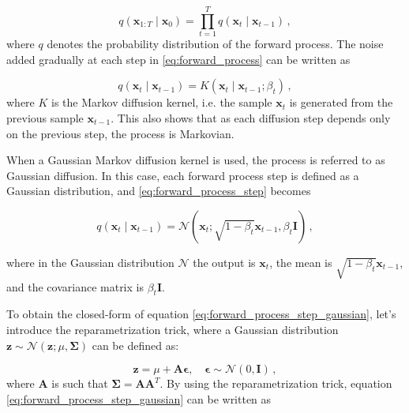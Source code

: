 \begin{equation}
    q\left(\mathbf{x}_{1: T} \mid \mathbf{x}_{0}\right)=\prod_{t=1}^{T} q\left(\mathbf{x}_{t} \mid \mathbf{x}_{t-1}\right) \,,
    \label{eq:forward_process}
    \end{equation}
where $q$ denotes the probability distribution of the forward process. The noise added gradually at each step in \ref{eq:forward_process} can be written as

\begin{equation}
    q\left(\mathbf{x}_{t} \mid \mathbf{x}_{t-1}\right) = K \left(\mathbf{x}_{t} \mid \mathbf{x}_{t-1} ; \beta_{t}\right) \,,
    \label{eq:forward_process_step}
    \end{equation}
where $K$ is the Markov diffusion kernel, i.e. the sample $\mathbf{x}_t$ is generated from the previous sample $\mathbf{x}_{t-1}$. This also shows that as each diffusion step depends only on the previous step, the process is Markovian. \cite{strümke2023lecturenotesprobabilisticdiffusion}

When a Gaussian Markov diffusion kernel is used, the process is referred to as Gaussian diffusion. In this case, each forward process step is defined as a Gaussian distribution, and \ref{eq:forward_process_step} becomes

\begin{equation}
    q\left(\mathbf{x}_{t} \mid \mathbf{x}_{t-1}\right)=\mathcal{N}\left(\mathbf{x}_{t} ; \sqrt{1-\beta_{t}} \mathbf{x}_{t-1}, \beta_{t} \mathbf{I}\right) \,,
    \label{eq:forward_process_step_gaussian}
\end{equation}

where in the Gaussian distribution $\mathcal{N}$ the output is $\mathbf{x}_t$, the mean is $\sqrt{1-\beta_{t}} \mathbf{x}_{t-1}$, and the covariance matrix is $\beta_{t}\mathbf{I}$. \cite{strümke2023lecturenotesprobabilisticdiffusion,sohldickstein2015deepunsupervisedlearningusing}

To obtain the closed-form of equation \ref{eq:forward_process_step_gaussian}, let's introduce the reparametrization trick, where a Gaussian distribution $\mathbf{z} \sim \mathcal{N}(\mathbf{z}; \mu, \boldsymbol{\Sigma})$ can be defined as: 

\begin{equation}
\mathbf{z} = \mu + \mathbf{A}\boldsymbol{\epsilon}, \quad \boldsymbol{\epsilon} \sim \mathcal{N}(0,\mathbf{I}) \,,
\label{eq:reparametrization_trick}
\end{equation}
where $\mathbf{A}$ is such that $\boldsymbol{\Sigma} = \mathbf{A}\mathbf{A}^T$. By using the reparametrization trick, equation \ref{eq:forward_process_step_gaussian} can be written as

